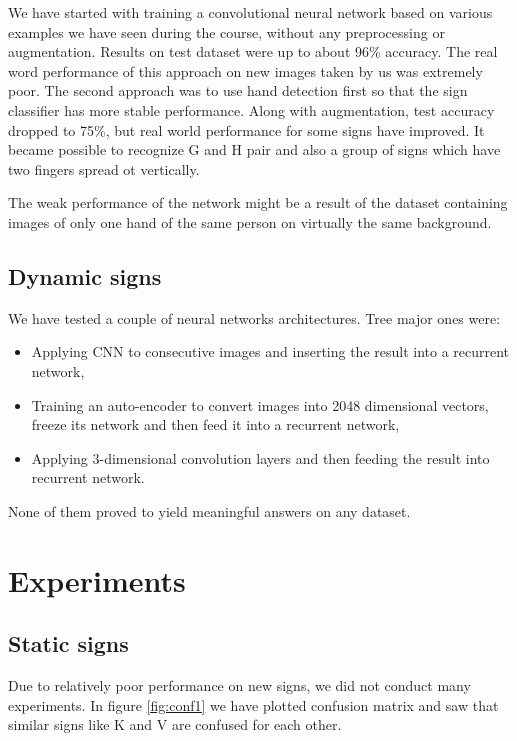 \documentclass[10pt,twocolumn,letterpaper]{article}
\begin{document}
We have started with training a convolutional neural network based on various
examples we have seen during the course, without any preprocessing or augmentation.
Results on test dataset were up to about 96\% accuracy. The real word performance of
this approach on new images taken by us was extremely poor. The second approach
was to use hand detection first so that the sign classifier has more stable
performance. Along with augmentation, test accuracy dropped to 75\%, but
real world performance for some signs have improved. It became possible
to recognize G and H pair and also a group of signs which have two fingers spread
ot vertically.

The weak performance of the network might be a result of the dataset containing images of only one hand of the same person on virtually the same background.

\subsection{Dynamic signs}

We have tested a couple of neural networks architectures. Tree major ones were:

\begin{itemize}
	\item Applying CNN to consecutive images and inserting the result into a recurrent network,
	\item Training an auto-encoder to convert images into 2048 dimensional vectors, freeze its network and then feed it into a recurrent network,
	\item Applying 3-dimensional convolution layers and then feeding the result into recurrent network.
\end{itemize}

None of them proved to yield meaningful answers on any dataset.

\section{Experiments}

\subsection{Static signs}

Due to relatively poor performance on new signs, we did not conduct many experiments.
In figure \ref{fig:conf1} we have plotted confusion matrix and saw that similar signs like K and V are confused for
each other.
\end{document}
